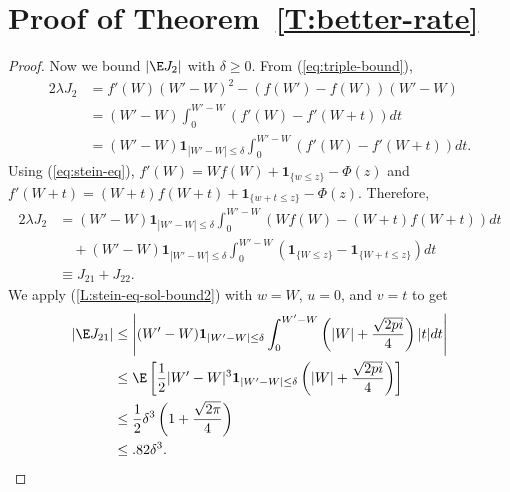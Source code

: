 \section{Proof of Theorem~\ref{T:better-rate}}
\begin{proof}
  Now we bound $|\E J_2|$ with $\delta \geq 0$.  From (\ref{eq:triple-bound}),
  \begin{align*}
    2 \lambda J_2 &= f'(W)(W'-W)^2-(f(W')-f(W))(W'-W) \\
    &= (W'-W) \int_0^{W'-W}(f'(W) - f'(W+t)) dt \\
    &= (W'-W) \mathbf{1}_{|W'-W| \leq \delta} \int_0^{W'-W}(f'(W)-f'(W+t)) dt.
  \end{align*}
  Using (\ref{eq:stein-eq}), $f'(W) = Wf(W) + \mathbf{1}_{\{w \leq z\}} - \Phi(z)$ and
  $f'(W + t) = (W + t)f(W + t) + \mathbf{1}_{\{w + t \leq z\}} - \Phi(z)$. Therefore,
  \begin{align*}
    2 \lambda J_2 &= (W'-W) \mathbf{1}_{|W'-W| \leq \delta} \int_0^{W'-W}(Wf(W)-(W+t)f(W+t)) dt \\
    &\quad + (W'-W) \mathbf{1}_{|W'-W| \leq \delta} \int_0^{W'-W}(\mathbf{1}_{\{W \leq z\}} - \mathbf{1}_{\{W + t \leq z\}}) dt \\
    &\equiv J_{21} + J_{22}.
  \end{align*}
  We apply (\ref{L:stein-eq-sol-bound2}) with $w = W$, $u = 0$, and $v = t$ to get
  \begin{align*}
    |\E J_{21}| &\leq \left |
    (W'-W) \mathbf{1}_{|W'-W| \leq \delta} \int_0^{W'-W} \left( |W| + \frac{\sqrt{2 pi}}{4} \right ) |t| dt
    \right | \\
    &\leq \E \left [
      \frac{1}{2} |W' - W|^3 \mathbf{1}_{|W'-W| \leq \delta} \left( |W| + \frac{\sqrt{2 pi}}{4} \right )
    \right ] \\
    &\leq \frac{1}{2} \delta^3 \left ( 1 + \frac{\sqrt{2 \pi}}{4} \right ) \\
    &\leq .82 \delta^3.
  \end{align*}


\end{proof}
